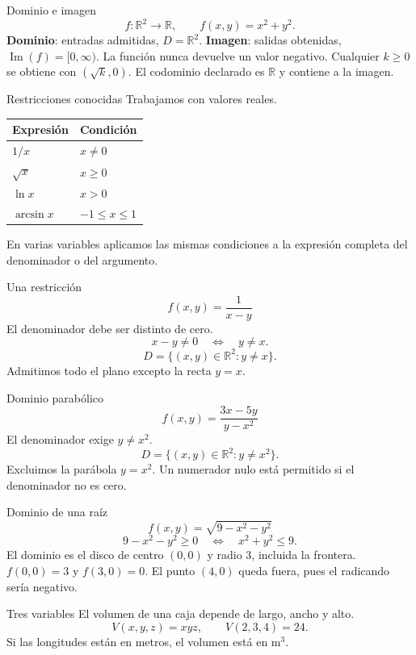 \begin{frame}{Dominio e imagen}
\[f:\mathbb R^2\to\mathbb R,\qquad f(x,y)=x^2+y^2.\]
\textbf{Dominio}: entradas admitidas, $D=\mathbb R^2$.
\medskip
\textbf{Imagen}: salidas obtenidas, $\operatorname{Im}(f)=[0,\infty)$.
\medskip
La función nunca devuelve un valor negativo. Cualquier $k\ge0$ se obtiene con $(\sqrt k,0)$.
\medskip
El codominio declarado es $\mathbb R$ y contiene a la imagen.
\end{frame}
\begin{frame}{Restricciones conocidas}
Trabajamos con valores reales.
\begin{center}\begin{tabular}{ll}
Expresión & Condición\\\hline
$1/x$ & $x\ne0$\\[3mm]
$\sqrt{x}$ & $x\ge0$\\[3mm]
$\ln x$ & $x>0$\\[3mm]
$\arcsin x$ & $-1\le x\le1$
\end{tabular}\end{center}
En varias variables aplicamos las mismas condiciones a la expresión completa del denominador o del argumento.
\end{frame}
\begin{frame}{Una restricción}
\[f(x,y)=\frac1{x-y}\]
El denominador debe ser distinto de cero.
\[x-y\ne0\quad\Longleftrightarrow\quad y\ne x.\]
\[D=\{(x,y)\in\mathbb R^2:y\ne x\}.\]
Admitimos todo el plano excepto la recta $y=x$.
\end{frame}
\begin{frame}{Dominio parabólico}
\[f(x,y)=\frac{3x-5y}{y-x^2}\]
El denominador exige $y\ne x^2$.
\[D=\{(x,y)\in\mathbb R^2:y\ne x^2\}.\]
Excluimos la parábola $y=x^2$. Un numerador nulo está permitido si el denominador no es cero.
\end{frame}
\begin{frame}{Dominio de una raíz}
\[f(x,y)=\sqrt{9-x^2-y^2}\]
\[9-x^2-y^2\ge0\quad\Longleftrightarrow\quad x^2+y^2\le9.\]
El dominio es el disco de centro $(0,0)$ y radio $3$, incluida la frontera.
\medskip
$f(0,0)=3$ y $f(3,0)=0$. El punto $(4,0)$ queda fuera, pues el radicando sería negativo.
\end{frame}
\begin{frame}{Tres variables}
El volumen de una caja depende de largo, ancho y alto.
\[V(x,y,z)=xyz,\qquad V(2,3,4)=24.\]
Si las longitudes están en metros, el volumen está en $\mathrm{m}^3$.
\end{frame}
